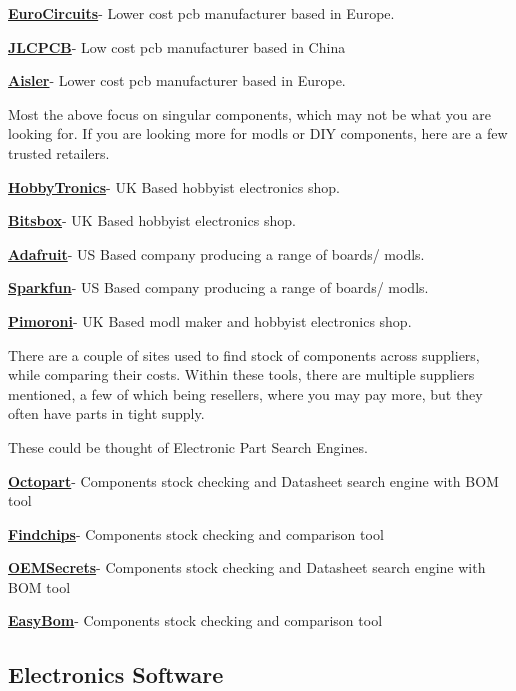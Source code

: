 \documentclass[a4paper,11pt]{report}
\let\oldhref\href %
\renewcommand{\href}[2]{\oldhref{#1}{\bfseries#2}}
\begin{document}
\href{https://www.eurocircuits.com/}{EuroCircuits}- Lower cost \gls{pcb} manufacturer based in Europe.

\href{https://jlcpcb.com/}{JLCPCB}- Low cost \gls{pcb} manufacturer based in China

\href{https://aisler.net/}{Aisler}- Lower cost \gls{pcb} manufacturer based in Europe.


Most the above focus on singular components, which may not be what you are looking for. If you are looking more for \gls{modl}s or DIY components, here are a few trusted retailers.

\href{https://www.hobbytronics.co.uk/}{HobbyTronics}- UK Based hobbyist electronics shop.

\href{https://www.bitsbox.co.uk/}{Bitsbox}- UK Based hobbyist electronics shop.

\href{https://www.adafruit.com/}{Adafruit}- US Based company producing a range of boards/ \gls{modl}s.

\href{https://www.sparkfun.com/}{Sparkfun}- US Based company producing a range of boards/ \gls{modl}s.

\href{https://shop.pimoroni.com/}{Pimoroni}- UK Based \gls{modl} maker and hobbyist electronics shop.


There are a couple of sites used to find stock of components across suppliers, while comparing their costs. Within these tools, there are multiple suppliers mentioned, a few of which being resellers, where you may pay more, but they often have parts in tight supply.

These could be thought of Electronic Part Search Engines.

\href{https://octopart.com/}{Octopart}- Components stock checking and Datasheet search engine with BOM tool

\href{https://www.findchips.com/}{Findchips}- Components stock checking and comparison tool

\href{https://www.oemsecrets.com/}{OEMSecrets}- Components stock checking and Datasheet search engine with BOM tool

\href{https://www.easybom.com/}{EasyBom}- Components stock checking and comparison tool

\vspace*{1\baselineskip}

\subsection{Electronics Software}
\end{document}
